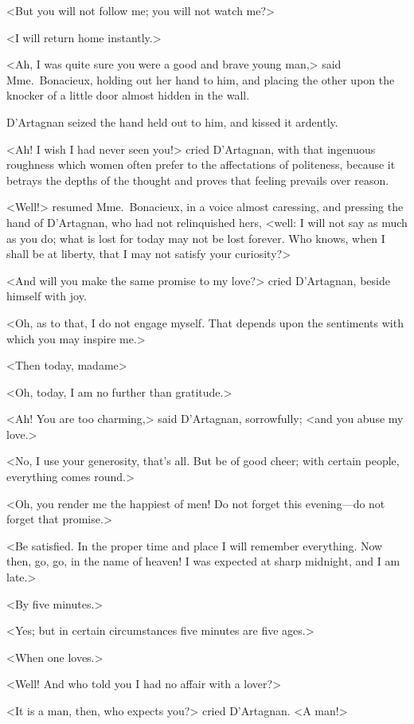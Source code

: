 <But you will not follow me; you will not watch me?> 

<I will return home instantly.> 

<Ah, I was quite sure you were a good and brave young man,> said Mme.~Bonacieux, holding out her hand to him, and placing the other upon the knocker of a little door almost hidden in the wall. 

D'Artagnan seized the hand held out to him, and kissed it ardently. 

<Ah! I wish I had never seen you!> cried D'Artagnan, with that ingenuous roughness which women often prefer to the affectations of politeness, because it betrays the depths of the thought and proves that feeling prevails over reason. 

<Well!> resumed Mme.~Bonacieux, in a voice almost caressing, and pressing the hand of D'Artagnan, who had not relinquished hers, <well: I will not say as much as you do; what is lost for today may not be lost forever. Who knows, when I shall be at liberty, that I may not satisfy your curiosity?> 

<And will you make the same promise to my love?> cried D'Artagnan, beside himself with joy. 

<Oh, as to that, I do not engage myself. That depends upon the sentiments with which you may inspire me.> 

<Then today, madame\longdash> 

<Oh, today, I am no further than gratitude.> 

<Ah! You are too charming,> said D'Artagnan, sorrowfully; <and you abuse my love.> 

<No, I use your generosity, that's all. But be of good cheer; with certain people, everything comes round.> 

<Oh, you render me the happiest of men! Do not forget this evening—do not forget that promise.> 

<Be satisfied. In the proper time and place I will remember everything. Now then, go, go, in the name of heaven! I was expected at sharp midnight, and I am late.> 

<By five minutes.> 

<Yes; but in certain circumstances five minutes are five ages.> 

<When one loves.> 

<Well! And who told you I had no affair with a lover?> 

<It is a man, then, who expects you?> cried D'Artagnan. <A man!> 

